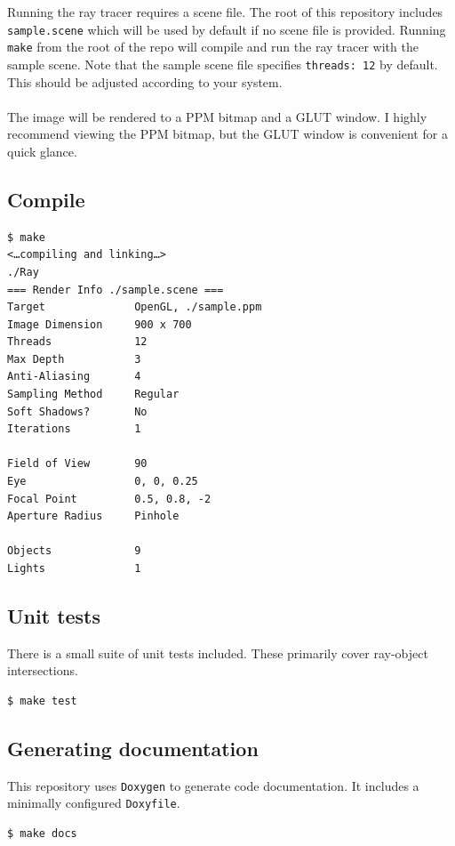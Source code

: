 \documentclass{article}
\begin{document}
Running the ray tracer requires a scene file.
The root of this repository includes \texttt{sample.scene} which will be used by default if no scene file is provided.
Running \texttt{make} from the root of the repo will compile and run the ray tracer with the sample scene.
Note that the sample scene file specifies \texttt{threads: 12} by default.
This should be adjusted according to your system.
\\\\
\noindent
The image will be rendered to a PPM bitmap and a GLUT window.
I highly recommend viewing the PPM bitmap, but the GLUT window is convenient for a quick glance.

\subsection{Compile}

\begin{verbatim}
$ make
<…compiling and linking…>
./Ray
=== Render Info ./sample.scene ===
Target              OpenGL, ./sample.ppm
Image Dimension     900 x 700
Threads             12
Max Depth           3
Anti-Aliasing       4
Sampling Method     Regular
Soft Shadows?       No
Iterations          1

Field of View       90
Eye                 0, 0, 0.25
Focal Point         0.5, 0.8, -2
Aperture Radius     Pinhole

Objects             9
Lights              1
\end{verbatim}

\subsection{Unit tests}

There is a small suite of unit tests included.
These primarily cover ray-object intersections.

\begin{verbatim}
$ make test
\end{verbatim}

\subsection{Generating documentation}

This repository uses \texttt{Doxygen} to generate code documentation.
It includes a minimally configured \texttt{Doxyfile}.

\begin{verbatim}
$ make docs
\end{verbatim}
\end{document}
